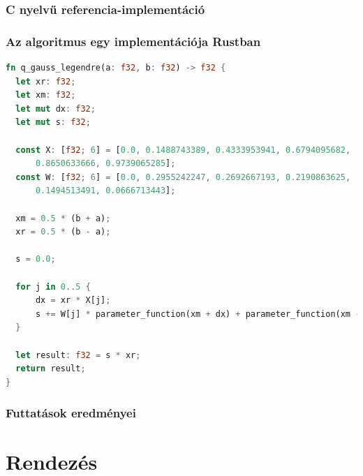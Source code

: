 \subsubsection{C nyelvű referencia-implementáció}
\subsubsection{Az algoritmus egy implementációja Rustban}
\begin{lstlisting}[language=Rust]
fn q_gauss_legendre(a: f32, b: f32) -> f32 {
  let xr: f32;
  let xm: f32;
  let mut dx: f32;
  let mut s: f32;
  
  const X: [f32; 6] = [0.0, 0.1488743389, 0.4333953941, 0.6794095682,
      0.8650633666, 0.9739065285];
  const W: [f32; 6] = [0.0, 0.2955242247, 0.2692667193, 0.2190863625,
      0.1494513491, 0.0666713443];
  
  xm = 0.5 * (b + a);
  xr = 0.5 * (b - a);
  
  s = 0.0;
  
  for j in 0..5 {
	  dx = xr * X[j];
	  s += W[j] * parameter_function(xm + dx) + parameter_function(xm - dx);
  }
  
  let result: f32 = s * xr;
  return result;
}  
\end{lstlisting}

\subsubsection{Futtatások eredményei}

\section{Rendezés}

